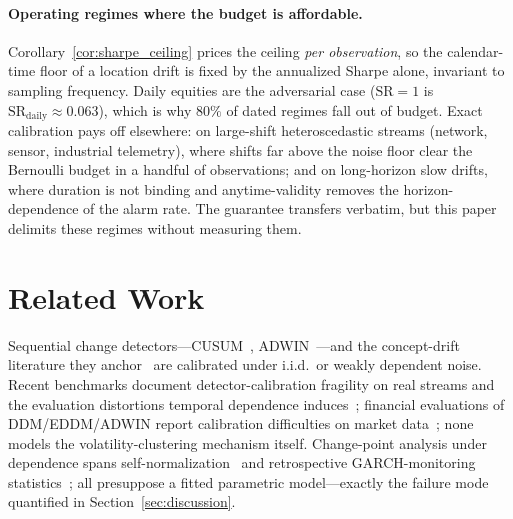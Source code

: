 \documentclass[sigconf,anonymous,review]{acmart}
\theoremstyle{acmdefinition}
\begin{document}
\paragraph{Operating regimes where the budget is affordable.}
Corollary~\ref{cor:sharpe_ceiling} prices the ceiling \emph{per observation}, so the calendar-time floor of a location drift is fixed by the annualized Sharpe alone, invariant to sampling frequency. Daily equities are the adversarial case ($\mathrm{SR} = 1$ is $\mathrm{SR}_{\mathrm{daily}} \approx 0.063$), which is why $80\%$ of dated regimes fall out of budget. Exact calibration pays off elsewhere: on large-shift heteroscedastic streams (network, sensor, industrial telemetry), where shifts far above the noise floor clear the Bernoulli budget in a handful of observations; and on long-horizon slow drifts, where duration is not binding and anytime-validity removes the horizon-dependence of the alarm rate. The guarantee transfers verbatim, but this paper delimits these regimes without measuring them.

\section{Related Work}\label{sec:related}

Sequential change detectors---CUSUM~\cite{page_1954}, ADWIN~\cite{bifet_adwin_2007}---and the concept-drift literature they anchor~\cite{gama_survey_2014, lu_concept_drift_2018} are calibrated under i.i.d.\ or weakly dependent noise. Recent benchmarks document detector-calibration fragility on real streams and the evaluation distortions temporal dependence induces~\cite{lukats_2024, ziffer_tenet_2024}; financial evaluations of DDM/EDDM/ADWIN report calibration difficulties on market data~\cite{neri_2021, cavalcante_2015}; none models the volatility-clustering mechanism itself. Change-point analysis under dependence spans self-normalization~\cite{shao_2010} and retrospective GARCH-monitoring statistics~\cite{aue_horvath_2013, berkes_2004, horvath_2006, song_kang_2020}; all presuppose a fitted parametric model---exactly the failure mode quantified in Section~\ref{sec:discussion}.
\end{document}
